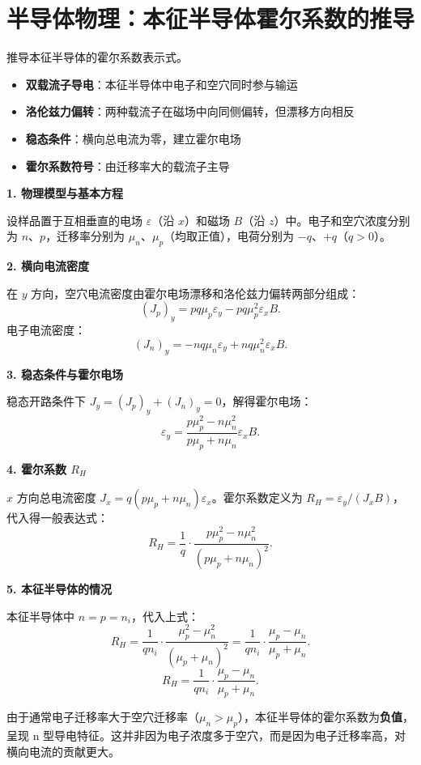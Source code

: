 \section{半导体物理：本征半导体霍尔系数的推导}
\label{sec:intrinsic-hall-coefficient}

\begin{modelbox}[题目：推导本征半导体的霍尔系数表示式]
推导本征半导体的霍尔系数表示式。
\end{modelbox}

\begin{tipbox}[考点快速分析]
\begin{itemize}
    \item \textbf{双载流子导电}：本征半导体中电子和空穴同时参与输运
    \item \textbf{洛伦兹力偏转}：两种载流子在磁场中向同侧偏转，但漂移方向相反
    \item \textbf{稳态条件}：横向总电流为零，建立霍尔电场
    \item \textbf{霍尔系数符号}：由迁移率大的载流子主导
\end{itemize}
\end{tipbox}

\begin{derivationbox}[标准解题过程]
\textbf{1. 物理模型与基本方程}

设样品置于互相垂直的电场 $\varepsilon$（沿 $x$）和磁场 $B$（沿 $z$）中。电子和空穴浓度分别为 $n$、$p$，迁移率分别为 $\mu_n$、$\mu_p$（均取正值），电荷分别为 $-q$、$+q$（$q>0$）。

\textbf{2. 横向电流密度}

在 $y$ 方向，空穴电流密度由霍尔电场漂移和洛伦兹力偏转两部分组成：
\[
(J_p)_y=pq\mu_p\varepsilon_y-pq\mu_p^2\varepsilon_xB.
\]
电子电流密度：
\[
(J_n)_y=-nq\mu_n\varepsilon_y+nq\mu_n^2\varepsilon_xB.
\]

\textbf{3. 稳态条件与霍尔电场}

稳态开路条件下 $J_y=(J_p)_y+(J_n)_y=0$，解得霍尔电场：
\[
\varepsilon_y=\frac{p\mu_p^2-n\mu_n^2}{p\mu_p+n\mu_n}\varepsilon_xB.
\]

\textbf{4. 霍尔系数 $R_H$}

$x$ 方向总电流密度 $J_x=q(p\mu_p+n\mu_n)\varepsilon_x$。霍尔系数定义为 $R_H=\varepsilon_y/(J_xB)$，代入得一般表达式：
\[
R_H=\frac{1}{q}\cdot\frac{p\mu_p^2-n\mu_n^2}{(p\mu_p+n\mu_n)^2}.
\]

\textbf{5. 本征半导体的情况}

本征半导体中 $n=p=n_i$，代入上式：
\[
R_H=\frac{1}{qn_i}\cdot\frac{\mu_p^2-\mu_n^2}{(\mu_p+\mu_n)^2}=\frac{1}{qn_i}\cdot\frac{\mu_p-\mu_n}{\mu_p+\mu_n}.
\]
\begin{equation}
\boxed{R_H=\frac{1}{qn_i}\cdot\frac{\mu_p-\mu_n}{\mu_p+\mu_n}.}
\end{equation}

由于通常电子迁移率大于空穴迁移率（$\mu_n>\mu_p$），本征半导体的霍尔系数为\textbf{负值}，呈现 n 型导电特征。这并非因为电子浓度多于空穴，而是因为电子迁移率高，对横向电流的贡献更大。
\end{derivationbox}

